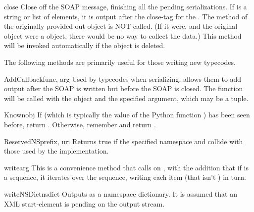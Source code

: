 \begin{methoddesc}{close}{}
Close off the SOAP message, finishing all the pending serializations.
If  is a string or list of elements, it is output after the
close-tag for the .
The  method of the originally provided out object is NOT called.
(If it were, and the original  object were a 
object, there would be no way to collect the data.)
This method will be invoked automatically if the object is deleted.
\end{methoddesc}

The following methods are primarily useful for those writing new typecodes.

\begin{methoddesc}{AddCallback}{func, arg}
Used by typecodes when serializing, allows them to add output after
the SOAP  is written but before the SOAP  is closed.
The function 
will be called with the  object and the specified 
argument, which may be a tuple.
\end{methoddesc}

\begin{methoddesc}{Known}{obj}
If  (which is typically the value of the Python function
) has been seen before, return .
Otherwise, remember  and return .
\end{methoddesc}

\begin{methoddesc}{ReservedNS}{prefix, uri}
Returns true if the specified namespace  and
collide with those used by the implementation.
\end{methoddesc}

\begin{methoddesc}{write}{arg}
This is a convenience method that calls 
on , with the addition that if  is a sequence,
it iterates over the sequence, writing each item (that isn't )
in turn.
\end{methoddesc}

\begin{methoddesc}{writeNSDict}{nsdict}
Outputs  as a namespace dictionary.
It is assumed that an XML start-element is pending on the output
stream.
\end{methoddesc}

